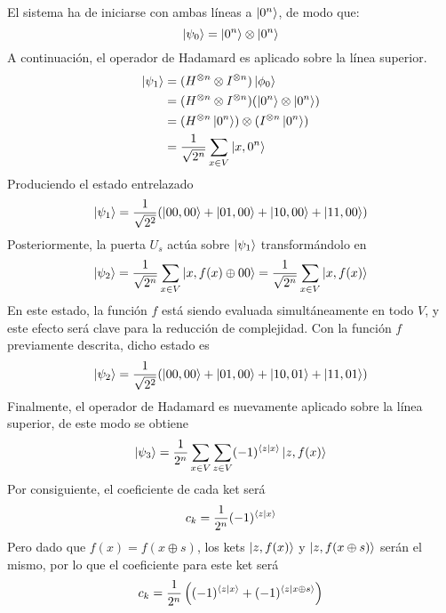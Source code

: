 El sistema ha de iniciarse con ambas líneas a $\ket{0^n}$, de modo que:
%
$$ \ket{\psi_0} = \ket{0^n} \otimes \ket{0^n} $$
%
A continuación, el operador de Hadamard es aplicado sobre la línea superior.
%
\begin{equation}
\begin{split}
\ket{\psi_1} & = (H^{\otimes n} \otimes I^{\otimes n}) \ket{\phi_0} \\
	& = (H^{\otimes n} \otimes I^{\otimes n}) (\ket{0^n} \otimes \ket{0^n}) \\
	& = (H^{\otimes n} \ket{0^n}) \otimes (I^{\otimes n} \ket{0^n}) \\
	& = \frac{1}{\sqrt{2^n}} \sum_{x \in V} \ket{x, 0^n}
\end{split}
\end{equation}
%
Produciendo el estado entrelazado
%
\begin{equation}
\ket{\psi_1} = \frac{1}{\sqrt{2^2}} (\ket{00,00} + \ket{01,00} + \ket{10,00} + 
\ket{11,00})
\end{equation}
%
Posteriormente, la puerta $U_s$ actúa sobre $\ket{\psi_1}$ transformándolo en
%
\begin{equation}
\ket{\psi_2} = \frac{1}{\sqrt{2^n}} \sum_{x \in V} \ket{x, f(x) \oplus 00} = 
\frac{1}{\sqrt{2^n}} \sum_{x \in V} \ket{x, f(x)}
\end{equation}
%
En este estado, la función $f$ está siendo evaluada simultáneamente en todo $V$, 
y este efecto será clave para la reducción de complejidad. Con la función $f$ 
previamente descrita, dicho estado es
%
\begin{equation}
\ket{\psi_2} = \frac{1}{\sqrt{2^2}} (\ket{00,00} + \ket{01,00} + \ket{10,01} + 
\ket{11,01})
\end{equation}
%
Finalmente, el operador de Hadamard es nuevamente aplicado sobre la línea 
superior, de este modo se obtiene
\begin{equation}
\ket{\psi_3} = \frac{1}{2^n} \sum_{x \in V} \sum_{z \in V}
	(-1)^{\braket{z|x}} \ket{z, f(x)}
\end{equation}
%
Por consiguiente, el coeficiente de cada ket será
%
\begin{equation}
c_k = \frac{1}{2^n} (-1)^{\braket{z|x}}
\end{equation}
%
Pero dado que $f(x) = f(x \oplus s)$, los kets $\ket{z, f(x)}$ y $\ket{z, f(x 
\oplus s)}$ serán el mismo, por lo que el coeficiente para este ket será
%
\begin{equation}
c_k = \frac{1}{2^n} \left((-1)^{\braket{z|x}} + (-1)^{\braket{z|x \oplus 
s}}\right)
\end{equation}
